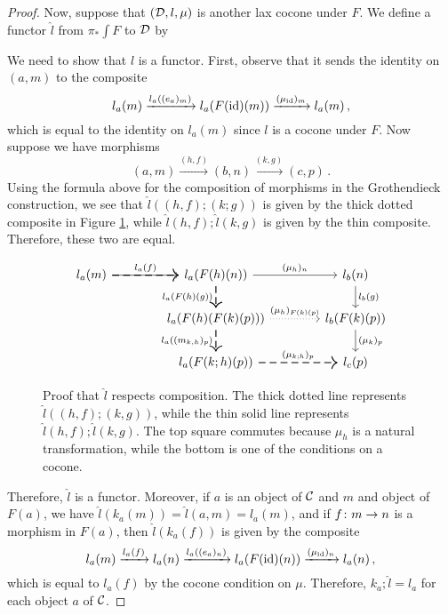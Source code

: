 \documentclass{article}
\begin{document}
\begin{proof}
  Now, suppose that $({\mathcal{D}},l,\mu)$ is another lax cocone under $F$.  
  We define a functor $\hat{l}$ from $\pi_*\int F$ to ${\mathcal{D}}$ by
  We need to show that $\hat{l}$ is a functor.  
  First, observe that it sends the identity on $(a,m)$ to the composite
  \[
    l_a(m) \xrightarrow{l_a((e_a)_m)}
    l_a(F(\operatorname{id})(m)) \xrightarrow{(\mu_{\operatorname{id}})_m}
    l_a(m)\,,
    \]
  which is equal to the identity on $l_a(m)$ since $l$ is a cocone under $F$.
  Now suppose we have morphisms
  \[
    (a,m) \xrightarrow{(h,f)}
    (b,n) \xrightarrow{(k,g)}
    (c,p)\,.
    \]
  Using the formula above for the composition of morphisms in the Grothendieck construction, we see that $\hat{l}((h,f);(k;g))$ is given by the thick dotted composite in Figure \ref{FigLHatFunctor}, while $\hat{l}(h,f);\hat{l}(k,g)$ is given by the thin composite.  
  Therefore, these two are equal.
  \begin{figure}
    \[
      \begin{tikzcd}[column sep=40pt]
        l_a(m) \arrow[r, "l_a(f)"] \arrow[r, thick, dashed]
          & l_a(F(h)(n)) \arrow[r, "(\mu_h)_n"] \arrow[d, "l_a(F(h)(g))"', thick, dashed]
            & l_b(n) \arrow[d, "l_b(g)"] \\
          & l_a(F(h)(F(k)(p))) \arrow[r, "(\mu_h)_{F(k)(p)}", dotted] \arrow[d, "l_a((m_{k,h})_p)"', thick, dashed]
            & l_b(F(k)(p)) \arrow[d, "(\mu_k)_p"] \\
          & l_a(F(k;h)(p)) \arrow[r, "(\mu_{k;h})_p", thick, dashed]
            & l_c(p)
      \end{tikzcd}
      \]
    \caption{Proof that $\hat{l}$ respects composition.  
    The thick dotted line represents $\hat{l}((h,f);(k,g))$, while the thin solid line represents $\hat{l}(h,f);\hat{l}(k,g)$.  
    The top square commutes because $\mu_h$ is a natural transformation, while the bottom is one of the conditions on a cocone.}
    \label{FigLHatFunctor}
  \end{figure}

  Therefore, $\hat{l}$ is a functor.  
  Moreover, if $a$ is an object of ${\mathcal{C}}$ and $m$ and object of $F(a)$, we have $\hat{l}(k_a(m))=\hat{l}(a,m)=l_a(m)$, and if $f\colon m \to n$ is a morphism in $F(a)$, then $\hat{l}(k_a(f))$ is given by the composite
  \[
    l_a(m) \xrightarrow{l_a(f)}
    l_a(n) \xrightarrow{l_a((e_a)_n)}
    l_a(F(\operatorname{id})(n)) \xrightarrow{(\mu_{\operatorname{id}})_n}
    l_a(n)\,,
    \]
  which is equal to $l_a(f)$ by the cocone condition on $\mu$.
  Therefore, $k_a;\hat{l}=l_a$ for each object $a$ of ${\mathcal{C}}$.


\end{proof}
\end{document}
